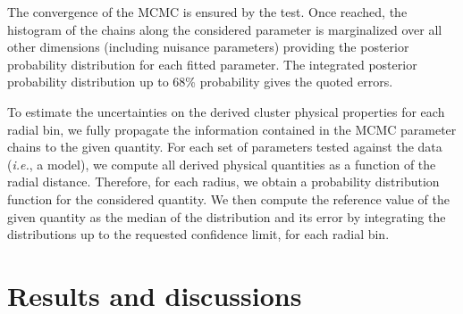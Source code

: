 \documentclass[twocolumn,traditabstract]{aa}
\begin{document}
The convergence of the MCMC is ensured by the \cite{gelman1992} test. Once reached, the histogram of the chains along the considered parameter is marginalized over all other dimensions (including nuisance parameters) providing the posterior probability distribution for each fitted parameter. The integrated posterior probability distribution up to 68\% probability gives the quoted errors.

To estimate the uncertainties on the derived cluster physical properties for each radial bin, we fully propagate the information contained in the MCMC parameter chains to the given quantity. For each set of parameters tested against the data ({\it i.e.}, a model), we compute all derived physical quantities as a function of the radial distance. Therefore, for each radius, we obtain a probability distribution function for the considered quantity. We then compute the reference value of the given quantity as the median of the distribution and its error by integrating the distributions up to the requested confidence limit, for each radial bin.

\section{Results and discussions}\label{sec:results}
\end{document}
